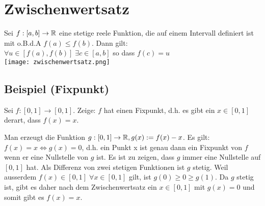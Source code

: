 \section{Zwischenwertsatz}
Sei $f: [a,b] \to \mathbb{R}$ eine stetige reele Funktion, die auf einem Intervall
definiert ist mit o.B.d.A $f(a) \leq f(b)$. Dann gilt:\\
{\small $\forall u \in [f(a), f(b)] \; \exists c \in [a, b]$ so dass $f(c) = u$} \\
\vspace{-0.2cm}
\hspace{5.cm}\texttt{[image: zwischenwertsatz.png]}

\vspace{-1cm}
\subsection{Beispiel (Fixpunkt)}
Sei $f: [0,1] \to [0,1]$. Zeige: $f$ hat einen Fixpunkt, d.h. es gibt ein $x
\in [0,1]$ derart, dass $f(x) = x$.

Man erzeugt die Funktion $g: [0,1] \to \mathbb{R}, g(x) := f(x) - x$. Es gilt: $f(x) =
x \Leftrightarrow g(x) = 0$, d.h. ein Punkt x ist genau dann ein Fixpunkt von
$f$ wenn er eine Nullstelle von $g$ ist. Es ist zu zeigen, dass $g$ immer eine
Nullstelle auf $[0,1]$ hat. Als Differenz von zwei stetigen Funktionen ist $g$
stetig. Weil ausserdem $f(x) \in [0,1] \; \forall x \in [0,1]$ gilt, ist $g(0)
\geq 0 \geq g(1)$. Da $g$ stetig ist, gibt es daher nach dem Zwischenwertsatz
ein $x \in [0,1]$ mit $g(x) = 0$ und somit gibt es $f(x) = x$.
